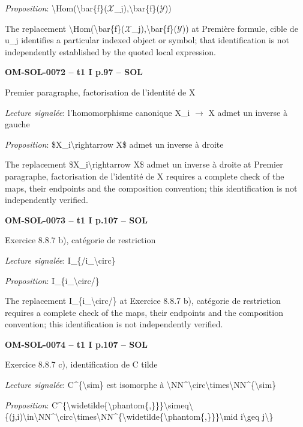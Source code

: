 \emph{Proposition}: \textbackslash{}Hom(\textbackslash{}bar\{f\}(\ensuremath{𝒳}\_j),\textbackslash{}bar\{f\}(\ensuremath{𝒴}))\par
The replacement \textbackslash{}Hom(\textbackslash{}bar\{f\}(\ensuremath{𝒳}\_j),\textbackslash{}bar\{f\}(\ensuremath{𝒴})) at Première formule, cible de u\_j identifies a particular indexed object or symbol; that identification is not independently established by the quoted local expression.\par
\par\noindent\textbf{OM-SOL-0072 -- t1 I p.97 -- SOL}\par
Premier paragraphe, factorisation de l'identité de X\par
\emph{Lecture signalée}: l'homomorphisme canonique X\_i \ensuremath{\to} X admet un inverse à gauche\par
\emph{Proposition}: \$X\_i\textbackslash{}rightarrow X\$ admet un inverse à droite\par
The replacement \$X\_i\textbackslash{}rightarrow X\$ admet un inverse à droite at Premier paragraphe, factorisation de l'identité de X requires a complete check of the maps, their endpoints and the composition convention; this identification is not independently verified.\par
\par\noindent\textbf{OM-SOL-0073 -- t1 I p.107 -- SOL}\par
Exercice 8.8.7 b), catégorie de restriction\par
\emph{Lecture signalée}: I\_\{/i\_\textbackslash{}circ\}\par
\emph{Proposition}: I\_\{i\_\textbackslash{}circ/\}\par
The replacement I\_\{i\_\textbackslash{}circ/\} at Exercice 8.8.7 b), catégorie de restriction requires a complete check of the maps, their endpoints and the composition convention; this identification is not independently verified.\par
\par\noindent\textbf{OM-SOL-0074 -- t1 I p.107 -- SOL}\par
Exercice 8.8.7 c), identification de C tilde\par
\emph{Lecture signalée}: C\textasciicircum{}\{\textbackslash{}sim\} est isomorphe à \textbackslash{}NN\textasciicircum{}\textbackslash{}circ\textbackslash{}times\textbackslash{}NN\textasciicircum{}\{\textbackslash{}sim\}\par
\emph{Proposition}: C\textasciicircum{}\{\textbackslash{}widetilde\{\textbackslash{}phantom\{,\}\}\}\textbackslash{}simeq\textbackslash{}\{(j,i)\textbackslash{}in\textbackslash{}NN\textasciicircum{}\textbackslash{}circ\textbackslash{}times\textbackslash{}NN\textasciicircum{}\{\textbackslash{}widetilde\{\textbackslash{}phantom\{,\}\}\}\textbackslash{}mid i\textbackslash{}geq j\textbackslash{}\}\par
